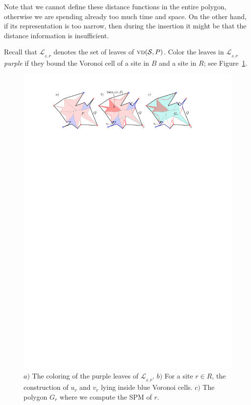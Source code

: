 \documentclass[a4paper, 11pt]{article}
\newcommand{\s}{\mathcal S}
\newcommand{\vd}[2][P]{\textsc{vd}(#2, #1)}
\newcommand{\LL}[1][\s, P]{\ensuremath{\mathcal L_{_{#1}}}}
\begin{document}
Note that we cannot define these distance functions in the entire polygon, otherwise we are spending already too much time and space.
On the other hand, if its representation is too narrow, then during the insertion it might be that the distance information is insufficient.

Recall that $\LL$ denotes the set of leaves of $\vd{\s}$.
Color the leaves in $\LL$ \emph{purple} if they bound the Voronoi cell of a site in $B$ and a site in $R$; see Figure~\ref{fig:RedPreprocessing}.


\begin{figure}[ht]
\centering
\includegraphics{imgRedPreprocessing.pdf}
\caption{$a)$ The coloring of the purple leaves of $\LL$.
$b)$ For a site $r\in R$, the construction of $u_r$ and $v_r$ lying inside blue Voronoi cells.
$c)$ The polygon $G_r$ where we compute the SPM of $r$.}
\label{fig:RedPreprocessing}
\end{figure}
\end{document}
